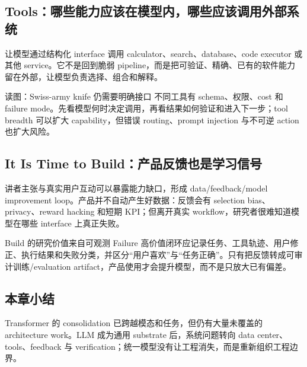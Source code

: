 \subsection{Tools：哪些能力应该在模型内，哪些应该调用外部系统}

让模型通过结构化 interface 调用 calculator、search、database、code executor 或其他 service。它不是回到脆弱 pipeline，而是把可验证、精确、已有的软件能力留在外部，让模型负责选择、组合和解释。


\begin{knowledgebox}{读图：Swiss-army knife 仍需要明确接口}
不同工具有 schema、权限、cost 和 failure mode。先看模型何时决定调用，再看结果如何验证和进入下一步；tool breadth 可以扩大 capability，但错误 routing、prompt injection 与不可逆 action 也扩大风险。
\end{knowledgebox}


\subsection{It Is Time to Build：产品反馈也是学习信号}

讲者主张与真实用户互动可以暴露能力缺口，形成 data/feedback/model improvement loop。产品并不自动产生好数据：反馈会有 selection bias、privacy、reward hacking 和短期 KPI；但离开真实 workflow，研究者很难知道模型在哪些 interface 上真正失败。


\begin{importantbox}{Build 的研究价值来自可观测 Failure}
高价值闭环应记录任务、工具轨迹、用户修正、执行结果和失败分类，并区分“用户喜欢”与“任务正确”。只有把反馈转成可审计训练/evaluation artifact，产品使用才会提升模型，而不是只放大已有偏差。
\end{importantbox}

\subsection{本章小结}

Transformer 的 consolidation 已跨越模态和任务，但仍有大量未覆盖的 architecture work。LLM 成为通用 substrate 后，系统问题转向 data center、tools、feedback 与 verification；统一模型没有让工程消失，而是重新组织工程边界。

